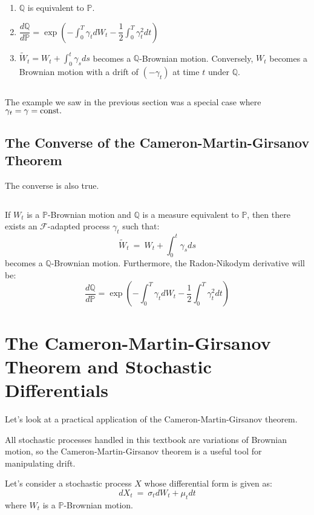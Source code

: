 \documentclass[uplatex,a4j,12pt,dvipdfmx]{jsarticle}
\begin{document}
\begin{enumerate}
	\item $\mathbb{Q}$ is equivalent to $\mathbb{P}$.
	\item $\displaystyle \dfrac{ d \mathbb{Q} }{ d \mathbb{P} } = \exp \left( - \int^{T}_{0} \gamma_{t} dW_{t} - \dfrac{1}{2} \int^{T}_{0} \gamma_{t}^{2} dt \right)$
	\item $\displaystyle \tilde{W}_{t} = W_{t} + \int^{t}_{0} \gamma_{s} ds$ becomes a $\mathbb{Q}$-Brownian motion.
	      Conversely, $W_{t}$ becomes a Brownian motion with a drift of $(-\gamma_{t})$ at time $t$ under $\mathbb{Q}$.
\end{enumerate}

${}$

The example we saw in the previous section was a special case where $\gamma_{t} = \gamma = {\rm const.}$

\subsection{The Converse of the Cameron-Martin-Girsanov Theorem}

The converse is also true.

${}$

If $W_{t}$ is a $\mathbb{P}$-Brownian motion and $\mathbb{Q}$ is a measure equivalent to $\mathbb{P}$, then there exists an $\mathcal{F}$-adapted process $\gamma_{t}$ such that:
$$
	\tilde{W}_{t}
	\ = \
	W_{t} + \int^{t}_{0} \gamma_{s} ds
$$
becomes a $\mathbb{Q}$-Brownian motion.
Furthermore, the Radon-Nikodym derivative will be:
$$
	\dfrac{ d \mathbb{Q} }{ d \mathbb{P} } = \exp \left( - \int^{T}_{0} \gamma_{t} dW_{t} - \dfrac{1}{2} \int^{T}_{0} \gamma_{t}^{2} dt \right)
$$

\section{The Cameron-Martin-Girsanov Theorem and Stochastic Differentials}

Let's look at a practical application of the Cameron-Martin-Girsanov theorem.

All stochastic processes handled in this textbook are variations of Brownian motion, so the Cameron-Martin-Girsanov theorem is a useful tool for manipulating drift.

Let's consider a stochastic process $X$ whose differential form is given as:
$$
	dX_{t}
	\ = \
	\sigma_{t} dW_{t}
	+
	\mu_{t} dt
$$
where $W_{t}$ is a $\mathbb{P}$-Brownian motion.
\end{document}
